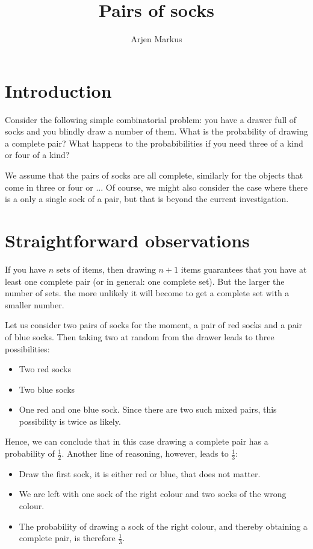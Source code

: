 \documentclass[onecolumn]{article}
\begin{document}
\title{Pairs of socks}

\author{Arjen Markus}

\maketitle

\section*{Introduction}
Consider the following simple combinatorial problem: you have a drawer full of
socks and you blindly draw a number of them. What is the probability of drawing
a complete pair? What happens to the probabibilities if you need three of a kind
or four of a kind?

We assume that the pairs of socks are all complete, similarly for the objects that
come in three or four or ... Of course, we might also consider the case where there
is a only a single sock of a pair, but that is beyond the current investigation.

\section*{Straightforward observations}
If you have $n$ sets of items, then drawing $n+1$ items guarantees that you have at
least one complete pair (or in general: one complete set). But the larger the number
of sets. the more unlikely it will become to get a complete set with a smaller
number.

Let us consider two pairs of socks for the moment, a pair of red socks and a pair
of blue socks. Then taking two at random from the drawer leads to three possibilities:
\begin{itemize}
\item
Two red socks
\item
Two blue socks
\item
One red and one blue sock. Since there are two such mixed pairs, this possibility
is twice as likely.
\end{itemize}

Hence, we can conclude that in this case drawing a complete pair has a probability
of $\frac{1}{2}$. Another line of reasoning, however, leads to $\frac{1}{3}$:
\begin{itemize}
\item
Draw the first sock, it is either red or blue, that does not matter.
\item
We are left with one sock of the right colour and two socks of the wrong colour.
\item
The probability of drawing a sock of the right colour, and thereby obtaining a complete
pair, is therefore $\frac{1}{3}$.
\end{itemize}
\end{document}
